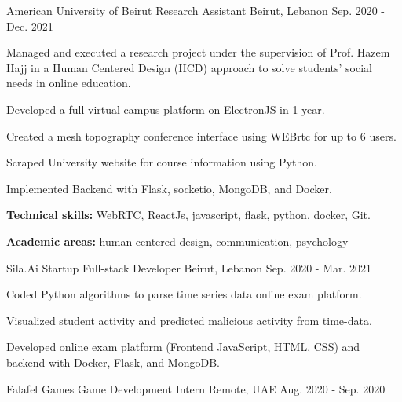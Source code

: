 \begin{cventries}
    

  \cventry
    {American University of Beirut} %
    {Research Assistant} %
    {Beirut, Lebanon} %
    {Sep.  2020 - Dec. 2021} %
    {
      \begin{cvitems} %
        \item Managed and executed a research project under the supervision of Prof. Hazem Hajj in a Human Centered Design (HCD) approach to solve students’ social needs in online education.
        \item \href{https://drive.google.com/file/d/1yCXrCYoeaBECwf5p4byoiabFzedO1Zgr/view?usp=sharing}{Developed a full virtual campus platform on ElectronJS in 1 year}.
        \item Created a mesh topography conference interface using WEBrtc for up to 6 users.
        \item Scraped University website for course information using Python.
        \item Implemented Backend with Flask, socketio, MongoDB, and Docker.
        \item { \textbf{Technical skills: } WebRTC, ReactJs, javascript, flask, python, docker, Git.}
        \item { \textbf {Academic areas:} human-centered design, communication, psychology}
      \end{cvitems}
    }



  \cventry
    {Sila.Ai Startup} %
    {Full-stack Developer} %
    {Beirut, Lebanon} %
    {Sep. 2020 - Mar. 2021} %
    {
      \begin{cvitems} %
        \item Coded Python algorithms to parse time series data online exam platform.
        \item Visualized student activity and predicted malicious activity from time-data.
        \item Developed online exam platform (Frontend JavaScript, HTML, CSS) and backend with Docker, Flask, and MongoDB.
      \end{cvitems}
    }



\cventry
    {Falafel Games} %
    {Game Development Intern} %
    {Remote, UAE} %
    {Aug. 2020 - Sep. 2020} %
    { }



\end{cventries}
    
